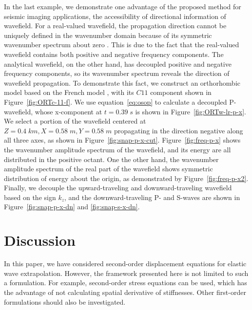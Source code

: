 
In the last example, we demonstrate one advantage of the proposed method for seismic imaging applications, the accessibility of directional information of wavefield. For a real-valued wavefield, the propagation direction cannot be uniquely defined in the wavenumber domain because of its symmetric wavenumber spectrum about zero \cite[]{hu16}. This is due to the fact that the real-valued wavefield contains both positive and negative frequency components. The analytical wavefield, on the other hand, has decoupled positive and negative frequency components, so its wavenumber spectrum reveals the direction of wavefield propagation. To demonstrate this fact, we construct an orthorhombic model based on the French model \cite[]{frenchmodel}, with its $C11$ component shown in Figure~\ref{fig:ORTc-11-f}. We use equation~\ref{eq:osop} to calculate a decoupled P-wavefield, whose x-component at $t=0.39\;s$ is shown in Figure~\ref{fig:ORTw-lr-p-x}. We select a portion of the wavefield centered at $Z=0.4\;km, X=0.58\;m, Y=0.58\;m$ propagating in the direction negative along all three axes, as shown in Figure~\ref{fig:snap-p-x-cut}. Figure~\ref{fig:freq-p-x} shows the wavenumber amplitude spectrum of the wavefield, and its energy are all distributed in the positive octant. One the other hand, the wavenumber amplitude spectrum of the real part of the wavefield shows symmetric distribution of energy about the origin, as demonstrated by Figure~\ref{fig:freq-p-x2}. Finally, we decouple the upward-traveling and downward-traveling wavefield based on the sign $k_z$, and the downward-traveling P- and S-waves are shown in Figure~\ref{fig:snap-p-x-dn} and \ref{fig:snap-s-x-dn}.

\section{Discussion}
In this paper, we have considered second-order displacement equations for elastic wave extrapolation. However, the framework presented here is not limited to such a formulation. For example, second-order stress equations can be used, which has the advantage of not calculating spatial derivative of stiffnesses. Other first-order formulations should also be investigated. 


